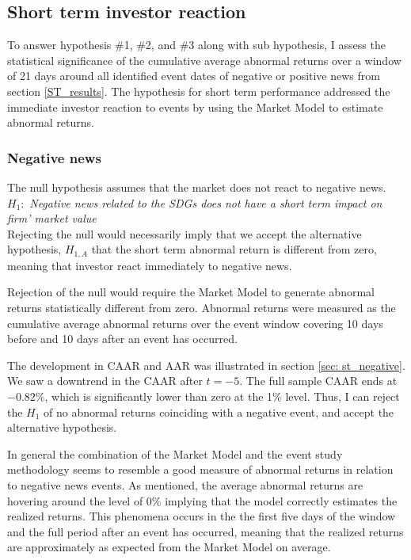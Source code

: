 
\subsection{Short term investor reaction} 
To answer hypothesis \#1, \#2, and \#3 along with sub hypothesis, I assess the statistical significance of the cumulative average abnormal returns over a window of 21 days around all identified event dates of negative or positive news from section \ref{ST_results}. The hypothesis for short term performance addressed the immediate investor reaction to events by using the Market Model to estimate abnormal returns. 

\subsubsection{Negative news}


The null hypothesis assumes that the market does not react to negative news. \\ 
$H_1:$ \textit{Negative news related to the SDGs does not have a short term impact on firm' market value} \\
Rejecting the null would necessarily imply that we accept the alternative hypothesis, $H_{1,A}$ that the short term abnormal return is different from zero, meaning that investor react immediately to negative news. 

Rejection of the null would require the Market Model to generate abnormal returns statistically different from zero. Abnormal returns were measured as the cumulative average abnormal returns over the event window covering 10 days before and 10 days after an event has occurred. 

The development in CAAR and AAR was illustrated in section \ref{sec: st_negative}. We saw a downtrend in the CAAR after $t = -5$. The full sample CAAR ends at $-0.82\%$, which is significantly lower than zero at the 1\% level. Thus, I can reject the $H_1$ of no abnormal returns coinciding with a negative event, and accept the alternative hypothesis. 

In general the combination of the Market Model and the event study methodology seems to resemble a good measure of abnormal returns in relation to negative news events. As mentioned, the average abnormal returns are hovering around the level of 0\% implying that the model correctly estimates the realized returns. This phenomena occurs in the the first five days of the window and the full period after an event has occurred, meaning that the realized returns are approximately as expected from the Market Model on average. 

